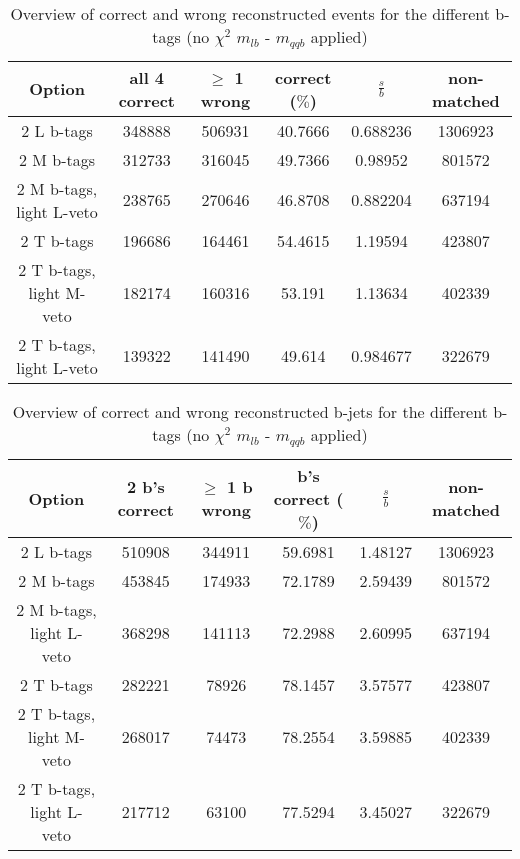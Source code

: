 \begin{table}[!h] 
 \begin{tabular}{c|c|c|c|c|c} 
  \textbf{Option} & all 4 correct & $\geq$ 1 wrong       & correct ($\%$)       & $\frac{s}{b}$ & non-matched \\ \hline 
  2 L b-tags              & 348888 & 506931 & 40.7666 & 0.688236 & 1306923\\ 
  2 M b-tags              & 312733 & 316045 & 49.7366 & 0.98952 & 801572\\ 
  2 M b-tags, light L-veto & 238765 & 270646 & 46.8708 & 0.882204 & 637194\\ 
  2 T b-tags              & 196686 & 164461 & 54.4615 & 1.19594 & 423807\\ 
  2 T b-tags, light M-veto & 182174 & 160316 & 53.191 & 1.13634 & 402339\\ 
  2 T b-tags, light L-veto & 139322 & 141490 & 49.614 & 0.984677 & 322679\\ 
 \end{tabular} 
 \caption{Overview of correct and wrong reconstructed events for the different b-tags (no $\chi^{2}$ $m_{lb}$ - $m_{qqb}$ applied)}
\end{table} 
 
\begin{table}[!h] 
 \begin{tabular}{c|c|c|c|c|c} 
  \textbf{Option} & 2 b's correct & $\geq$ 1 b wrong     & b's correct ($\%$)   & $\frac{s}{b}$ & non-matched \\ \hline 
  2 L b-tags              & 510908 & 344911 & 59.6981 & 1.48127 & 1306923\\ 
  2 M b-tags              & 453845 & 174933 & 72.1789 & 2.59439 & 801572\\ 
  2 M b-tags, light L-veto & 368298 & 141113 & 72.2988 & 2.60995 & 637194\\ 
  2 T b-tags              & 282221 & 78926 & 78.1457 & 3.57577 & 423807\\ 
  2 T b-tags, light M-veto & 268017 & 74473 & 78.2554 & 3.59885 & 402339\\ 
  2 T b-tags, light L-veto & 217712 & 63100 & 77.5294 & 3.45027 & 322679\\ 
 \end{tabular} 
 \caption{Overview of correct and wrong reconstructed b-jets for the different b-tags (no $\chi^{2}$ $m_{lb}$ - $m_{qqb}$ applied)}
\end{table} 
 

